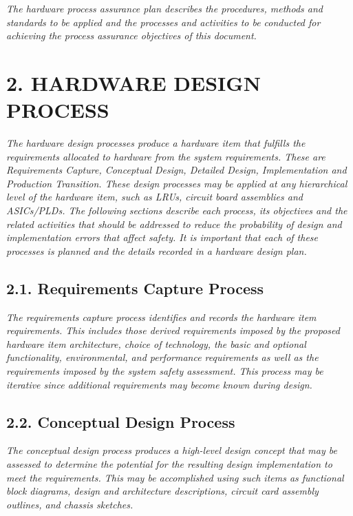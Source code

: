 \documentclass[]{article}
\begin{document}
\emph{The hardware process assurance plan describes the procedures,
methods and standards to be applied and the processes and activities to
be conducted for achieving the process assurance objectives of this
document.}

\section{2. HARDWARE DESIGN PROCESS}\label{hardware-design-process}

\emph{The hardware design processes produce a hardware item that
fulfills the requirements allocated to hardware from the system
requirements. These are Requirements Capture, Conceptual Design,
Detailed Design, Implementation and Production Transition. These design
processes may be applied at any hierarchical level of the hardware item,
such as LRUs, circuit board assemblies and ASICs/PLDs. The following
sections describe each process, its objectives and the related
activities that should be addressed to reduce the probability of design
and implementation errors that affect safety. It is important that each
of these processes is planned and the details recorded in a hardware
design plan.}

\subsection{2.1. Requirements Capture
Process}\label{requirements-capture-process}

\emph{The requirements capture process identifies and records the
hardware item requirements. This includes those derived requirements
imposed by the proposed hardware item architecture, choice of
technology, the basic and optional functionality, environmental, and
performance requirements as well as the requirements imposed by the
system safety assessment. This process may be iterative since additional
requirements may become known during design.}

\subsection{2.2. Conceptual Design
Process}\label{conceptual-design-process}

\emph{The conceptual design process produces a high-level design concept
that may be assessed to determine the potential for the resulting design
implementation to meet the requirements. This may be accomplished using
such items as functional block diagrams, design and architecture
descriptions, circuit card assembly outlines, and chassis sketches.}
\end{document}
